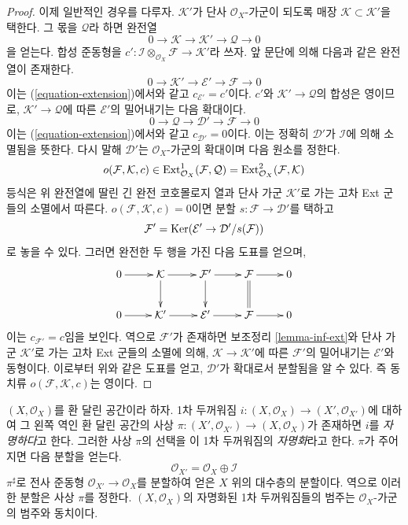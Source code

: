 \begin{proof}
\medskip\noindent
이제 일반적인 경우를 다루자. $\mathcal{K}'$가 단사
$\mathcal{O}_X$-가군이 되도록 매장 $\mathcal{K}\subset\mathcal{K}'$을
택한다. 그 몫을 $\mathcal{Q}$라 하면 완전열
$$
0 \to \mathcal{K} \to \mathcal{K}' \to \mathcal{Q} \to 0
$$
을 얻는다. 합성 준동형을
$c':\mathcal{I}\otimes_{\mathcal{O}_X}\mathcal{F}\to\mathcal{K}'$라
쓰자. 앞 문단에 의해 다음과 같은 완전열이 존재한다.
$$
0 \to \mathcal{K}' \to \mathcal{E}' \to \mathcal{F} \to 0
$$
이는 (\ref{equation-extension})에서와 같고 $c_{\mathcal{E}'}=c'$이다.
$c'$와 $\mathcal{K}'\to\mathcal{Q}$의 합성은 영이므로,
$\mathcal{K}'\to\mathcal{Q}$에 따른 $\mathcal{E}'$의 밀어내기는
다음 확대이다.
$$
0 \to \mathcal{Q} \to \mathcal{D}' \to \mathcal{F} \to 0
$$
이는 (\ref{equation-extension})에서와 같고 $c_{\mathcal{D}'}=0$이다.
이는 정확히 $\mathcal{D}'$가 $\mathcal{I}$에 의해 소멸됨을 뜻한다.
다시 말해 $\mathcal{D}'$는 $\mathcal{O}_X$-가군의 확대이며 다음 원소를
정한다.
$$
o(\mathcal{F}, \mathcal{K}, c) \in
\mathop{\mathrm{Ext}}\nolimits^1_{\mathcal{O}_X}(\mathcal{F}, \mathcal{Q}) =
\mathop{\mathrm{Ext}}\nolimits^2_{\mathcal{O}_X}(\mathcal{F}, \mathcal{K})
$$
등식은 위 완전열에 딸린 긴 완전 코호몰로지 열과 단사 가군
$\mathcal{K}'$로 가는 고차 Ext 군들의 소멸에서 따른다.
$o(\mathcal{F},\mathcal{K},c)=0$이면 분할
$s:\mathcal{F}\to\mathcal{D}'$를 택하고
$$
\mathcal{F}' = \mathop{\mathrm{Ker}}(\mathcal{E}' \to \mathcal{D}'/s(\mathcal{F}))
$$
로 놓을 수 있다. 그러면 완전한 두 행을 가진 다음 도표를 얻으며,
$$
\xymatrix{
0 \ar[r] &
\mathcal{K} \ar[r] \ar[d] &
\mathcal{F}' \ar[r] \ar[d] &
\mathcal{F} \ar[r] \ar@{=}[d] &
0 \\
0 \ar[r] &
\mathcal{K}' \ar[r] &
\mathcal{E}' \ar[r] &
\mathcal{F} \ar[r] & 0
}
$$
이는 $c_{\mathcal{F}'}=c$임을 보인다. 역으로 $\mathcal{F}'$가 존재하면
보조정리 \ref{lemma-inf-ext}와 단사 가군 $\mathcal{K}'$로 가는 고차
Ext 군들의 소멸에 의해, $\mathcal{K}\to\mathcal{K}'$에 따른
$\mathcal{F}'$의 밀어내기는 $\mathcal{E}'$와 동형이다. 이로부터 위와
같은 도표를 얻고, $\mathcal{D}'$가 확대로서 분할됨을 알 수 있다.
즉 동치류 $o(\mathcal{F},\mathcal{K},c)$는 영이다.
\end{proof}

\begin{remark}
\label{remark-trivial-thickening}
$(X,\mathcal{O}_X)$를 환 달린 공간이라 하자. 1차 두꺼워짐
$i:(X,\mathcal{O}_X)\to(X',\mathcal{O}_{X'})$에 대하여 그
왼쪽 역인 환 달린 공간의 사상
$\pi:(X',\mathcal{O}_{X'})\to(X,\mathcal{O}_X)$가 존재하면 $i$를
{\it 자명하다}고 한다. 그러한 사상 $\pi$의 선택을 이 1차 두꺼워짐의
{\it 자명화}라고 한다. $\pi$가 주어지면 다음 분할을 얻는다.
\begin{equation}
\label{equation-splitting}
\mathcal{O}_{X'} = \mathcal{O}_X \oplus \mathcal{I}
\end{equation}
$\pi^\sharp$로 전사 준동형 $\mathcal{O}_{X'}\to\mathcal{O}_X$를
분할하여 얻은 $X$ 위의 대수층의 분할이다. 역으로 이러한 분할은 사상
$\pi$를 정한다. $(X,\mathcal{O}_X)$의 자명화된 1차 두꺼워짐들의 범주는
$\mathcal{O}_X$-가군의 범주와 동치이다.
\end{remark}

